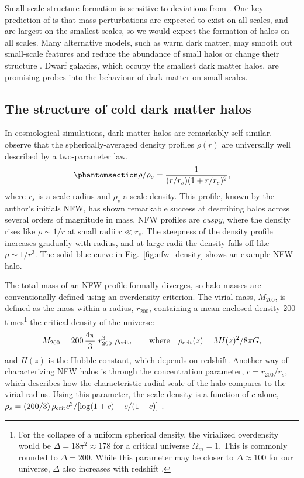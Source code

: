 Small-scale structure formation is sensitive to deviations from \LCDM{}
\citep[e.g.,][]{bechtol+2022}. One key prediction of \LCDM{} is that
mass perturbations are expected to exist on all scales, and are largest
on the smallest scales, so we would expect the formation of halos on all
scales. Many alternative models, such as warm dark matter, may smooth
out small-scale features and reduce the abundance of small halos or
change their structure \citep[e.g.,][]{lovell+2014}. Dwarf galaxies,
which occupy the smallest dark matter halos, are promising probes into
the behaviour of dark matter on small scales.

\subsection{The structure of cold dark matter halos}\label{sec:NFW}

In \LCDM{} cosmological simulations, dark matter halos are remarkably
self-similar. \citet{NFW1996, NFW1997} observe that the
spherically-averaged density profiles \(\rho(r)\) are universally well
described by a two-parameter law,
\begin{equation}\protect\phantomsection\label{eq:nfw}{
\rho/\rho_s= \frac{1}{(r/r_s)(1+r/r_s)^2},
}\end{equation} where \(r_s\) is a scale radius and \(\rho_s\) a scale
density. This profile, known by the author's initials NFW, has shown
remarkable success at describing \LCDM{} halos across several orders of
magnitude in mass. NFW profiles are \emph{cuspy}, where the density
rises like \(\rho \sim 1/r\) at small radii \(r \ll r_s\). The steepness
of the density profile increases gradually with radius, and at large
radii the density falls off like \(\rho \sim 1/r^3\). The solid blue
curve in Fig.~\ref{fig:nfw_density} shows an example NFW halo.

The total mass of an NFW profile formally diverges, so halo masses are
conventionally defined using an overdensity criterion. The virial mass,
\(M_{200}\), is defined as the mass within a radius, \(r_{200}\),
containing a mean enclosed density 200 times\footnote{For the collapse
  of a uniform spherical density, the virialized overdensity would be
  \(\Delta = 18\pi^2\approx 178\) for a critical universe
  \(\Omega_m = 1\). This is commonly rounded to \(\Delta = 200\). While
  this parameter may be closer to \(\Delta \approx 100\) for our
  universe, \(\Delta\) also increases with redshift \citep[see, e.g.,
  eq. 6 from][]{bryan+norman1998}.} the critical density of the
universe: \begin{equation}{
M_{200} =200\,\frac{4\pi}{3} \ r_{200}^3\ \rho_{\rm crit}, \qquad {\rm where} \quad \rho_{\rm crit}(z) = 3H(z)^2 / 8\pi G,
}\end{equation} and \(H(z)\) is the Hubble constant, which depends on
redshift. Another way of characterizing NFW halos is through the
concentration parameter, \(c=r_{200} / r_s\), which describes how the
characteristic radial scale of the halo compares to the virial radius.
Using this parameter, the scale density is a function of \(c\) alone,
\(\rho_s = (200/3)\,\rho_{\rm crit} c^3 / [\log(1+c) - c/(1+c)]\)
\citep{NFW1996}.

